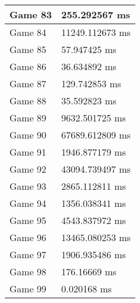 \begin{tabular}{|l|l|}
	Game 83 & 255.292567 ms \\ \hline
	Game 84 & 11249.112673 ms \\ \hline
	Game 85 & 57.947425 ms \\ \hline
	Game 86 & 36.634892 ms \\ \hline
	Game 87 & 129.742853 ms \\ \hline
	Game 88 & 35.592823 ms \\ \hline
	Game 89 & 9632.501725 ms \\ \hline
	Game 90 & 67689.612809 ms \\ \hline
	Game 91 & 1946.877179 ms \\ \hline
	Game 92 & 43094.739497 ms \\ \hline
	Game 93 & 2865.112811 ms \\ \hline
	Game 94 & 1356.038341 ms \\ \hline
	Game 95 & 4543.837972 ms \\ \hline
	Game 96 & 13465.080253 ms \\ \hline
	Game 97 & 1906.935486 ms \\ \hline
	Game 98 & 176.16669 ms \\ \hline
	Game 99 & 0.020168 ms \\ \hline
\end{tabular}
